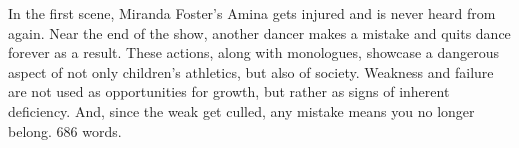 \documentclass[12pt]{article}[titlepage]
\newcommand{\1}{\={a}}
\newcommand{\2}{\={e}}
\newcommand{\3}{\={\i}}
\newcommand{\4}{\=o}
\newcommand{\5}{\=u}
\newcommand{\6}{\={A}}
\renewcommand{\,}{\textsuperscript{,}}
\begin{document}
In the first scene, Miranda Foster's Amina gets injured and is never heard from again.
Near the end of the show, another dancer makes a mistake and quits dance forever as a result.
These actions, along with monologues, showcase a dangerous aspect of not only children's athletics, but also of society.
Weakness and failure are not used as opportunities for growth, but rather as signs of inherent deficiency.
And, since the weak get culled, any mistake means you no longer belong.
686 words.
\end{document}
